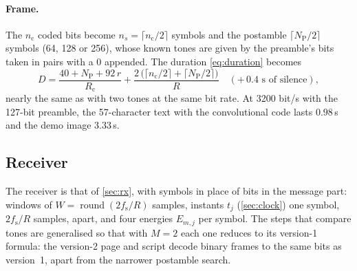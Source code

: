 \documentclass[11pt,a4paper]{article}
\newcommand{\round}[1]{\operatorname{round}\!\left(#1\right)}
\newcommand{\fs}{f_{\mathrm{s}}}
\newcommand{\Rc}{R_{\mathrm{c}}}
\newcommand{\NP}{N_{\mathrm{P}}}
\newcommand{\nc}{n_{\mathrm{c}}}
\theoremstyle{remark}
\begin{document}
\paragraph{Frame.}
The $\nc$ coded bits become $n_s = \lceil \nc/2 \rceil$ symbols and the postamble $\lceil \NP/2 \rceil$ symbols (64, 128 or 256), whose known tones are given by the preamble's bits taken in pairs with a 0 appended. The duration \cref{eq:duration} becomes
\begin{equation}
D = \frac{40 + \NP + 92\,r}{\Rc} + \frac{2\,\bigl(\lceil \nc/2 \rceil + \lceil \NP/2 \rceil\bigr)}{R} \quad (+\,0.4\text{ s of silence}),
\end{equation}
nearly the same as with two tones at the same bit rate. At 3200 bit/s with the 127-bit preamble, the 57-character text with the convolutional code lasts $0.98$\,s and the demo image $3.33$\,s.

\subsection{Receiver}
\label{sec:mfskrx}
The receiver is that of \cref{sec:rx}, with symbols in place of bits in the message part: windows of $W = \round{2\fs/R}$ samples, instants $t_j$ (\cref{sec:clock}) one symbol, $2\fs/R$ samples, apart, and four energies $E_{m,j}$ per symbol. The steps that compare tones are generalised so that with $M = 2$ each one reduces to its version-1 formula: the version-2 page and script decode binary frames to the same bits as version~1, apart from the narrower postamble search.
\end{document}
